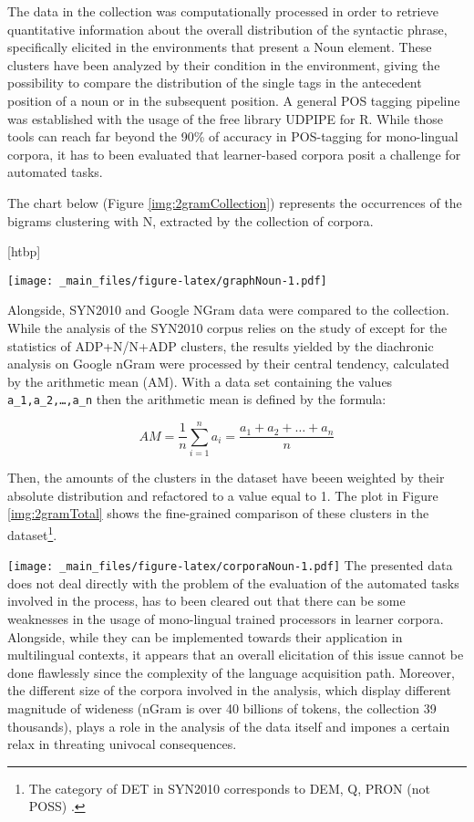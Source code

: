 \documentclass[a4paper,twoside,12pt,chapterprefix=false,listof=flat]{scrartcl}
\makeatletter
\def\fps@figure{htbp}
\renewenvironment{figure}[1][\fps@figure]{
  \edef\@tempa{\noexpand\@float{figure}[#1]} 
  \@tempa
  \sffamily
}{
  \end@float
}
\theoremstyle{plain} %
\theoremstyle{definition}
\theoremstyle{remark}
\makeatother
\begin{document}
The data in the collection was computationally processed in order to
retrieve quantitative information about the overall distribution of the
syntactic phrase, specifically elicited in the environments that present
a Noun element. These clusters have been analyzed by their condition in
the environment, giving the possibility to compare the distribution of
the single tags in the antecedent position of a noun or in the
subsequent position. A general POS tagging pipeline was established with
the usage of the free library UDPIPE for R. While those tools can reach
far beyond the 90\% of accuracy in POS-tagging for mono-lingual corpora,
it has to been evaluated that learner-based corpora posit a challenge
for automated tasks.

The chart below (Figure \ref{img:2gramCollection}) represents the
occurrences of the bigrams clustering with N, extracted by the
collection of corpora.

\begin{figure}
\centering
\texttt{[image: \_main\_files/figure-latex/graphNoun-1.pdf]}
\caption{\label{fig:graphNoun}\label{img:2gramCollection}Distribution of
2-grams with N in Collection}
\end{figure}

Alongside, SYN2010 and Google NGram data were compared to the
collection.\\
While the analysis of the SYN2010 corpus relies on the study of
\citep{veselovska2014} except for the statistics of ADP+N/N+ADP
clusters, the results yielded by the diachronic analysis on Google nGram
were processed by their central tendency, calculated by the arithmetic
mean (AM). With a data set containing the values
\texttt{a\_1,a\_2,\ldots{},a\_n} then the arithmetic mean is defined by
the formula:

\begin{equation}
    AM=\frac{1}{n}\sum_{i=1}^n a_i = \frac{a_1 + a_2 + \ldots + a_n}{n} 
\end{equation}

Then, the amounts of the clusters in the dataset have beeen weighted by
their absolute distribution and refactored to a value equal to 1. The
plot in Figure \ref{img:2gramTotal} shows the fine-grained comparison of
these clusters in the dataset\footnote{The category of DET in SYN2010
  corresponds to DEM, Q, PRON (not POSS) \citep[20]{veselovska2014}.}.

\texttt{[image: \_main\_files/figure-latex/corporaNoun-1.pdf]} The
presented data does not deal directly with the problem of the evaluation
of the automated tasks involved in the process, has to been cleared out
that there can be some weaknesses in the usage of mono-lingual trained
processors in learner corpora. Alongside, while they can be implemented
towards their application in multilingual contexts, it appears that an
overall elicitation of this issue cannot be done flawlessly since the
complexity of the language acquisition path. Moreover, the different
size of the corpora involved in the analysis, which display different
magnitude of wideness (nGram is over 40 billions of tokens, the
collection 39 thousands), plays a role in the analysis of the data
itself and impones a certain relax in threating univocal consequences.
\end{document}
